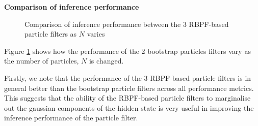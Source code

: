 \documentclass[../main.tex]{subfiles}
\begin{document}
\textbf{Comparison of inference performance}

\begin{figure}[h!]
	\centering
	\qquad
	
	\qquad
	\caption{Comparison of inference performance between the 3 RBPF-based particle filters as $N$ varies}
	\label{fig:4__1__1__RBPF_comparison}
\end{figure}

Figure \ref{fig:4__1__1__RBPF_comparison} shows how the performance of the 2 bootstrap particles filters vary as the number of particles, $N$ is changed. 

Firstly, we note that the performance of the 3 RBPF-based particle filters is in general better than the bootstrap particle filters across all performance metrics. This suggests that the ability of the RBPF-based particle filters to marginalise out the gaussian components of the hidden state is very useful in improving the inference performance of the particle filter. 
\end{document}
